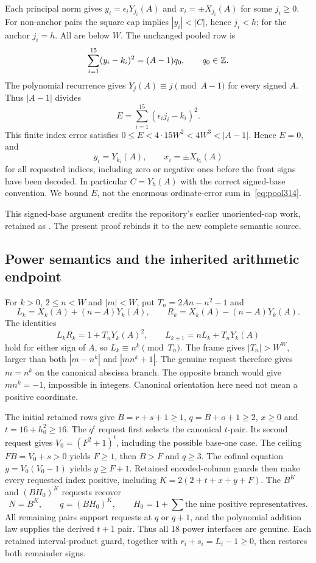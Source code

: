 Each principal norm gives
$y_i=\epsilon_iY_{j_i}(A)$ and $x_i=\pm X_{j_i}(A)$ for some
$j_i\ge0$. For non-anchor pairs the square cap implies
$|y_i|<|C|$, hence $j_i<h$; for the anchor $j_i=h$. All are below $W$.
The unchanged pooled row is
\begin{equation}\label{eq:pool314}
 \sum_{i=1}^{15}(y_i-k_i)^2=(A-1)q_0,
 \qquad q_0\in\mathbb Z.
\end{equation}
The polynomial recurrence gives $Y_j(A)\equiv j\pmod{A-1}$ for
every signed $A$. Thus $|A-1|$ divides
\[
 E=\sum_{i=1}^{15}(\epsilon_i j_i-k_i)^2.
\]
This finite index error satisfies
$0\le E<4\cdot15W^2<4W^3<|A-1|$. Hence $E=0$, and
\begin{equation}\label{eq:canonical314}
 y_i=Y_{k_i}(A),\qquad x_i=\pm X_{k_i}(A)
\end{equation}
for all requested indices, including zero or negative ones before the
front signs have been decoded. In particular $C=Y_h(A)$ with the correct
signed-base convention. We bound $E$, not the enormous ordinate-error
sum in~\eqref{eq:pool314}.

This signed-base argument credits the repository's earlier unoriented-cap
work, retained as . The present
proof rebinds it to the new complete semantic source.

\subsection{Power semantics and the inherited arithmetic endpoint}

For $k>0$, $2\le n<W$ and $|m|<W$, put $T_n=2An-n^2-1$ and
\[
 L_k=X_k(A)+(n-A)Y_k(A),\qquad
 R_k=X_k(A)-(n-A)Y_k(A).
\]
The identities
\[
 L_kR_k=1+T_nY_k(A)^2,\qquad
 L_{k+1}=nL_k+T_nY_k(A)
\]
hold for either sign of $A$, so $L_k\equiv n^k\pmod{T_n}$. The
frame gives $|T_n|>W^W$, larger than both $|m-n^k|$ and $|mn^k+1|$.
The genuine request therefore gives $m=n^k$ on the canonical abscissa
branch. The opposite branch would give $mn^k=-1$, impossible in integers.
Canonical orientation here need not mean a positive coordinate.

The initial retained rows give
$B=r+s+1\ge1$, $q=B+o+1\ge2$, $x\ge0$ and
$t=16+h_0^2\ge16$. The $q^t$ request first selects the canonical
$t$-pair. Its second request gives $V_0=(F^2+1)^t$, including the
possible base-one case. The ceiling $FB=V_0+s>0$ yields $F\ge1$,
then $B>F$ and $q\ge3$. The cofinal equation
$y=V_0(V_0-1)$ yields $y\ge F+1$. Retained encoded-column guards
then make every requested index positive, including
$K=2(2+t+x+y+F)$. The $B^K$ and $(BH_0)^K$ requests recover
\[
 N=B^K,
 \qquad q=(BH_0)^K,
 \qquad H_0=1+\sum \text{the nine positive representatives}.
\]
All remaining pairs support requests at $q$ or $q+1$, and the polynomial
addition law supplies the derived $t+1$ pair. Thus all 18 power
interfaces are genuine. Each retained interval-product guard, together
with $r_i+s_i=L_i-1\ge0$, then restores both remainder signs.


